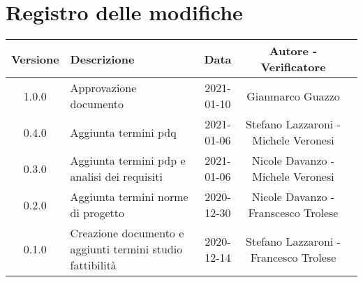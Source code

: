 \section*{Registro delle modifiche}

\begin{center}
	\begin{longtable}{|c|p{5cm}|c|c|c|}
	\hline
	\rowcolor{lighter-grayer}
	\textbf{Versione} & \textbf{Descrizione} & \textbf{Data} & \textbf{Autore - Verificatore} \\
	\hline
	\endfirsthead


	\hline
	1.0.0 & Approvazione documento & 2021-01-10 & Gianmarco Guazzo\\
	0.4.0 & Aggiunta termini pdq & 2021-01-06 & Stefano Lazzaroni - Michele Veronesi\\
	0.3.0 & Aggiunta termini pdp e analisi dei requisiti & 2021-01-06 & Nicole Davanzo - Michele Veronesi\\
	0.2.0 & Aggiunta termini norme di progetto & 2020-12-30 & Nicole Davanzo -  Franscesco Trolese\\
	0.1.0 & Creazione documento e aggiunti termini studio fattibilità & 2020-12-14 & Stefano Lazzaroni - Francesco Trolese\\
	\hline

	\end{longtable}
\end{center}